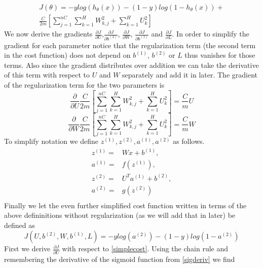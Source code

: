 \documentclass{article}
\begin{document}
\begin{equation}\label{cost}
\begin{split}
J(\theta) = -ylog(h_{\theta}(x))-(1-y)log(1-h_{\theta}(x))+\\ \frac{C}{2m} \left[ \sum_{j=1}^{nC} \sum_{k=1}^H W_{k,j}^2 + \sum_{k=1}^H U_{k}^2\right]
\end{split}
\end{equation}
We now derive the gradients \(\frac{\partial J}{\partial U}\),\(\frac{\partial J}{\partial b^{(2)}}\), \(\frac{\partial J}{\partial W}\), \(\frac{\partial J}{\partial b^{(1)}}\) and \(\frac{\partial J}{\partial L}\).  In order to simplify the gradient for each parameter notice that the regularization term (the second term in the cost function) does not depend on \(b^{(1)}\), \(b^{(2)}\) or \(L\) thus vanishes for those terms.  Also since the gradient distributes over addition we can take the derivative of this term with respect to \(U\) and \(W\) separately and add it in later.  The gradient of the regularization term for the two parameters is
\begin{equation}\label{ureg}
\frac{\partial}{\partial U}\frac{C}{2m} \left[ \sum_{j=1}^{nC} \sum_{k=1}^H W_{k,j}^2 + \sum_{k=1}^H U_{k}^2\right] = \frac{C}{m}U
\end{equation}
\begin{equation}\label{wreg}
\frac{\partial}{\partial W}\frac{C}{2m} \left[ \sum_{j=1}^{nC} \sum_{k=1}^H W_{k,j}^2 + \sum_{k=1}^H U_{k}^2\right] = \frac{C}{m}W
\end{equation}
To simplify notation we define \( z^{(1)}, z^{(2)}, a^{(1)}, a^{(2)} \) as follows.
\begin{equation}
\begin{aligned}
z^{(1)} =& Wx + b^{(1)}, \\
a^{(1)} =& f(z^{(1)}), \\
z^{(2)} =& U^T a^{(1)} + b^{(2)}, \\
a^{(2)} =& g(z^{(2)}) \\
\end{aligned}
\end{equation}
Finally we let the even further simplified cost function written in terms of the above defininitions without regularization (as we will add that in later) be defined as
\begin{equation}\label{simplecost}
J(U,b^{(2)},W,b^{(1)},L) = -ylog(a^{(2)})-(1-y)log(1-a^{(2)})
\end{equation}
First we derive \(\frac{\partial J}{\partial U}\) with respect to \eqref{simplecost}.  Using the chain rule and remembering the derivative of the sigmoid function from \eqref{sigderiv} we find
\end{document}
